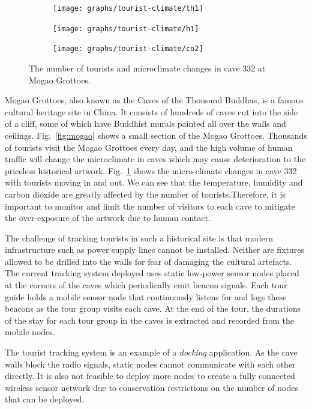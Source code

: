 \documentclass[twoside,twocolumn]{article}
\begin{document}
\begin{figure}[t]
   \centering
   \begin{subfigure}
      \centering
      \texttt{[image: graphs/tourist-climate/th1]}
   \end{subfigure}
   \begin{subfigure}
      \centering
      \texttt{[image: graphs/tourist-climate/h1]}
   \end{subfigure}
   \begin{subfigure}
      \centering
      \texttt{[image: graphs/tourist-climate/co2]}
   \end{subfigure}
   \caption{The number of tourists and microclimate changes in cave 332 at Mogao Grottoes.} 
   \label{fig:microclimate}
\end{figure}

Mogao Grottoes, also known as the Caves of the Thousand Buddhas, is a
famous cultural heritage site in China. It consists of hundreds of
caves cut into the side of a cliff, some of which have Buddhist murals
painted all over the walls and ceilings.  Fig.~\ref{fig:mogao} shows
a small section of the Mogao Grottoes. Thousands of tourists visit the
Mogao Grottoes every day, and the high volume of human traffic will
change the microclimate in caves which may cause deterioration to the 
priceless historical artwork. Fig.~\ref{fig:microclimate} shows the 
micro-climate changes in cave 332 with tourists moving in and out. 
We can see that the temperature, humidity and carbon dioxide are greatly
affected by the number of tourists.Therefore, it is important to monitor 
and limit the number of visitors to each cave to mitigate the over-exposure 
of the artwork due to human contact.

The challenge of tracking tourists in such a historical site is that
modern infrastructure such as power supply lines cannot be installed. 
Neither are fixtures allowed to be drilled into the walls
for fear of damaging the cultural artefacts. The current tracking
system deployed uses static low-power sensor nodes placed at the
corners of the caves which periodically emit beacon signals.  Each
tour guide holds a mobile sensor node that continuously listens for
and logs these beacons as the tour group visits each cave.  At the end
of the tour, the durations of the stay for each tour group in the
caves is extracted and recorded from the mobile nodes.

The tourist tracking system is an example of a {\em docking}
application. As the cave walls block the radio signals, static nodes
cannot communicate with each other directly. It is also not feasible
to deploy more nodes to create a fully connected wireless sensor
network due to conservation restrictions on the number of nodes that
can be deployed.
\end{document}
